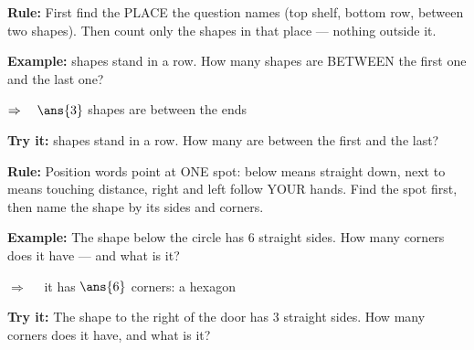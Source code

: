\documentclass[12pt]{article}
\begin{document}


\begin{formulabox}
\textbf{Rule:} First find the PLACE the question names (top shelf, bottom
row, between two shapes). Then count only the shapes in that place ---
nothing outside it.
\end{formulabox}

\begin{examplebox}
\textbf{Example:}  shapes stand in a row. How many shapes are BETWEEN
the first one and the last one?

$\Rightarrow\quad \ans{3}$ shapes are between the ends
\end{examplebox}

\begin{tryitbox}
\textbf{Try it:}  shapes stand in a row. How many are between the
first and the last?\\[2pt]
\end{tryitbox}


\begin{formulabox}
\textbf{Rule:} Position words point at ONE spot: below means straight down,
next to means touching distance, right and left follow YOUR hands. Find the
spot first, then name the shape by its sides and corners.
\end{formulabox}

\begin{examplebox}
\textbf{Example:} \quad The shape below the circle has 6 straight sides.
How many corners does it have --- and what is it?

$\Rightarrow\quad$ it has $\ans{6}$ corners: a hexagon
\end{examplebox}

\begin{tryitbox}
\textbf{Try it:} \quad The shape to the right of the door has 3 straight
sides. How many corners does it have, and what is it?\\[2pt]
\end{tryitbox}
\end{document}
